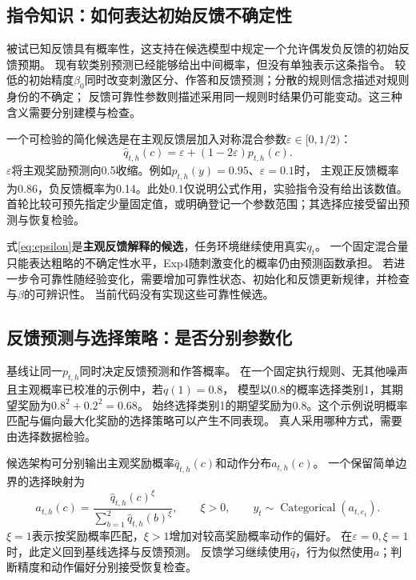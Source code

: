\documentclass[11pt,a4paper]{article}
\numberwithin{equation}{section}
\newcommand{\Cat}{\operatorname{Categorical}}
\begin{document}
\subsection{指令知识：如何表达初始反馈不确定性}
被试已知反馈具有概率性，这支持在候选模型中规定一个允许偶发负反馈的初始反馈预期。
现有软类别预测已经能够给出中间概率，但没有单独表示这条指令。
较低的初始精度$\beta_0$同时改变刺激区分、作答和反馈预测；分散的规则信念描述对规则身份的不确定；
反馈可靠性参数则描述采用同一规则时结果仍可能变动。这三种含义需要分别建模与检查。

一个可检验的简化候选是在主观反馈层加入对称混合参数$\varepsilon\in[0,1/2)$：
\begin{equation}
\widehat q_{t,h}(c)=\varepsilon+(1-2\varepsilon)p_{t,h}(c).
\label{eq:epsilon}
\end{equation}
$\varepsilon$将主观奖励预测向0.5收缩。例如$p_{t,h}(y)=0.95$、$\varepsilon=0.1$时，
主观正反馈概率为0.86，负反馈概率为0.14。此处0.1仅说明公式作用，实验指令没有给出该数值。
首轮比较可预先指定少量固定值，或明确登记一个参数范围；其选择应接受留出预测与恢复检验。

式\eqref{eq:epsilon}是\textbf{主观反馈解释的候选}，任务环境继续使用真实$q_t$。
一个固定混合量只能表达粗略的不确定性水平，Exp4随刺激变化的概率仍由预测函数承担。
若进一步令可靠性随经验变化，需要增加可靠性状态、初始化和反馈更新规律，并检查与$\beta$的可辨识性。
当前代码没有实现这些可靠性候选。

\subsection{反馈预测与选择策略：是否分别参数化}
基线让同一$p_{t,h}$同时决定反馈预测和作答概率。
在一个固定执行规则、无其他噪声且主观概率已校准的示例中，若$q(1)=0.8$，
模型以0.8的概率选择类别1，其期望奖励为$0.8^2+0.2^2=0.68$。
始终选择类别1的期望奖励为0.8。这个示例说明概率匹配与偏向最大化奖励的选择策略可以产生不同表现。
真人采用哪种方式，需要由选择数据检验。

候选架构可分别输出主观奖励概率$\widehat q_{t,h}(c)$和动作分布$a_{t,h}(c)$。
一个保留简单边界的选择映射为
\begin{equation}
a_{t,h}(c)=\frac{\widehat q_{t,h}(c)^\xi}
{\sum_{b=1}^2\widehat q_{t,h}(b)^\xi},\qquad \xi>0,
\qquad y_t\sim\Cat(a_{t,e_t}).
\label{eq:policy}
\end{equation}
$\xi=1$表示按奖励概率匹配，$\xi>1$增加对较高奖励概率动作的偏好。
在$\varepsilon=0,\xi=1$时，此定义回到基线选择与反馈预测。
反馈学习继续使用$\widehat q$，行为似然使用$a$；判断精度和动作偏好分别接受恢复检查。
\end{document}

